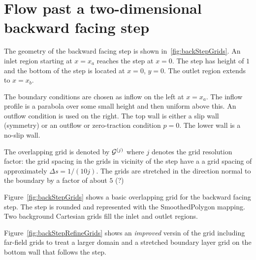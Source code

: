 \documentclass[11pt]{article}
\begin{document}
\section{Flow past a two-dimensional backward facing step}

The geometry of the backward facing step is shown in~\ref{fig:backStepGrids}. 
An inlet region starting at $x=x_a$ reaches the step at $x=0$. The step has height of $1$ and the bottom
of the step is located at $x=0$, $y=0$. The outlet region extends to $x=x_b$. 

The boundary conditions are chosen as inflow on the left at $x=x_a$. The inflow profile is a parabola
over some small height and then uniform above this. An outflow condition is used on the right.
The top wall is either a slip wall (symmetry) or an outflow or zero-traction condition $p=0$. 
The lower wall is a no-slip wall.


The overlapping grid is denoted by ${\mathcal G}^{(j)}$ where $j$ denotes the grid resolution factor: the grid spacing in the 
grids in vicinity of the step have a a grid spacing of approximately $\Delta s = 1/(10 j)$. The grids are stretched
in the direction normal to the boundary by a factor of about $5$ (?)

Figure~\ref{fig:backStepGrids} shows a basic overlapping grid for the backward facing step.
The step is rounded and represented with the SmoothedPolygon mapping.
Two background Cartesian grids fill the inlet and outlet regions.

Figure~\ref{fig:backStepRefineGrids} shows an {\em improved} versin of the grid including far-field grids
to treat a larger domain and a stretched boundary layer grid on the bottom wall that follows the step.
\end{document}
